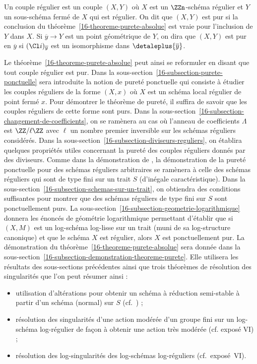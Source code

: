 \documentclass[10pt]{../fichiers-configuration-latex/smfart}
\begin{document}
\begin{definition2}
Un couple régulier est un couple $(X,Y)$ où $X$ est un $\ZZn$-schéma régulier
et $Y$ un sous-schéma fermé de $X$ qui est régulier. On dit que $(X,Y)$ est
pur si la conclusion du théorème~\ref{16-theoreme-purete-absolue} est vraie
pour l'inclusion de $Y$ dans $X$. Si $\overline y\to Y$ est un point
géométrique de $Y$, on dira que $(X,Y)$ est pur en $\overline y$ si
$(\Cl i)_{\overline y}$ est un isomorphisme dans $\detaleplus {\overline y}$.
\end{definition2}

Le théorème~\ref{16-theoreme-purete-absolue} peut ainsi se reformuler en
disant que tout couple régulier est pur. Dans la
sous-section~\ref{16-subsection-purete-ponctuelle} sera introduite la notion de
pureté ponctuelle qui consiste à étudier les couples réguliers de la forme
$(X,x)$ où $X$ est un schéma local régulier de
point fermé $x$. Pour
démontrer le théorème de pureté, il suffira de savoir que les couples
réguliers de cette forme sont purs. Dans la
sous-section~\ref{16-subsection-changement-de-coefficients}, on se ramènera
au cas où l'anneau de coefficients $\Lambda$ est $\ZZ/\ell\ZZ$ avec $\ell$
un nombre premier inversible sur les schémas réguliers considérés. Dans
la sous-section~\ref{16-subsection-diviseurs-reguliers}, on établira quelques
propriétés utiles concernant la pureté des couples réguliers donnés par des
diviseurs. 
Comme dans la démonstration de \cite{AZUMINO@Fujiwara},
la démonstration de la pureté ponctuelle pour des schémas réguliers
arbitraires se ramènera à celle des
schémas réguliers qui sont de type fini sur
un trait $S$ (d'inégale caractéristique). Dans la
sous-section~\ref{16-subsection-schemas-sur-un-trait}, on obtiendra des
conditions suffisantes pour montrer que des schémas réguliers de type fini
sur $S$ sont ponctuellement purs. La
sous-section~\ref{16-subsection-geometrie-logarithmique} donnera les énoncés
de géométrie logarithmique permettant d'établir que si $(X,M)$ est un
log-schéma log-lisse sur un trait (muni de sa log-structure canonique)
et que le schéma $X$ est régulier, alors $X$ est ponctuellement pur.
La démonstration du théorème~\ref{16-theoreme-purete-absolue}
sera donnée dans la
sous-section~\ref{16-subsection-demonstration-theoreme-purete}. Elle utilisera
les résultats des sous-sections précédentes ainsi que trois théorèmes de
résolution des singularités que l'on peut résumer ainsi :
\begin{itemize}
\item utilisation d'altérations pour obtenir un schéma à réduction
semi-stable à partir d'un schéma (normal) sur $S$
(cf.~\cite[proposition~4.4.1]{BS@Vidal}) ;
\item résolution des singularités d'une action modérée
d'un groupe fini sur un log-schéma log-régulier de façon à
obtenir une action très modérée (cf. exposé VI) ;
\item résolution des log-singularités des log-schémas log-réguliers
(cf.~exposé VI).
\end{itemize}
\end{document}
